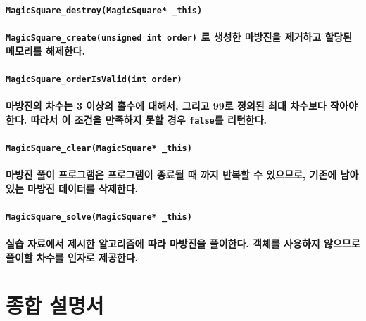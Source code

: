 \documentclass[UTF8]{report}
\begin{document}
            \paragraph{\texttt{MagicSquare\_destroy(MagicSquare* \_this)}}
            \paragraph{%
                \normalfont \texttt{MagicSquare\_create(unsigned int order)} 로 생성한 마방진을 제거하고 할당된 메모리를 해제한다.
            }

            \paragraph{\texttt{MagicSquare\_orderIsValid(int order)}}
            \paragraph{%
                \normalfont 마방진의 차수는 3 이상의 홀수에 대해서, 그리고 99로 정의된 최대 차수보다 작아야 한다. 따라서 이 조건을 만족하지 못할 경우 \texttt{false}를 리턴한다.
            }

            \paragraph{\texttt{MagicSquare\_clear(MagicSquare* \_this)}}
            \paragraph{%
                \normalfont 마방진 풀이 프로그램은 프로그램이 종료될 때 까지 반복할 수 있으므로, 기존에 남아있는 마방진 데이터를 삭제한다.
            }

            \paragraph{\texttt{MagicSquare\_solve(MagicSquare* \_this)}}
            \paragraph{%
                \normalfont 실습 자료에서 제시한 알고리즘에 따라 마방진을 풀이한다. 객체를 사용하지 않으므로 풀이할 차수를 인자로 제공한다.
            }

        \section{종합 설명서}
\end{document}
